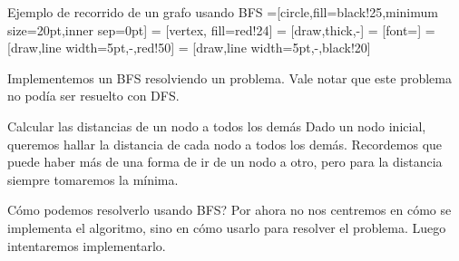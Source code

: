 \documentclass[compress]{beamer}
\begin{document}
\begin{frame}{Ejemplo de recorrido de un grafo usando BFS}
=[circle,fill=black!25,minimum size=20pt,inner sep=0pt]
 = [vertex, fill=red!24]
 = [draw,thick,-]
 = [font=\small]
 = [draw,line width=5pt,-,red!50]
 = [draw,line width=5pt,-,black!20]

\begin{figure}
\end{figure}
\end{frame}


\begin{frame}
Implementemos un BFS resolviendo un problema. Vale notar que este problema no podía ser resuelto con DFS.

\begin{block}{Calcular las distancias de un nodo a todos los demás}
Dado un nodo inicial, queremos hallar la distancia de cada nodo a todos los demás. Recordemos que puede haber más de una forma de ir de un nodo a otro, pero para la distancia siempre tomaremos la mínima.
\end{block}

\textquestiondown Cómo podemos resolverlo usando BFS? Por ahora no nos centremos en cómo se implementa el algoritmo, sino en cómo usarlo para resolver el problema. Luego intentaremos implementarlo.
\end{frame}
\end{document}
